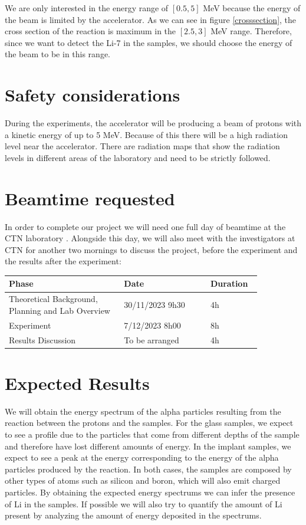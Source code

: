 \documentclass{article}
\begin{document}
\begin{multicols}{2}
We are only interested in the energy range of $[0.5,5]$ MeV because the energy of the beam is limited by the accelerator.
As we can see in figure \ref{crosssection}, the cross section of the reaction is maximum in the $[2.5,3]$ MeV range. 
Therefore, since we want to detect the Li-7 in the samples, we should choose the energy of the beam to be in this range.

\section{Safety considerations}

During the experiments, the accelerator will be producing a beam of protons with a kinetic energy of up to 5 MeV. Because of this there will be a high radiation level near the accelerator.
There are radiation maps that show the radiation levels in different areas of the laboratory and need to be strictly followed.

\section{Beamtime requested}

In order to complete our project we will need one full day of beamtime at the CTN laboratory \cite{IST}. Alongside this day, we will
also meet with the investigators at CTN for another two mornings to discuss the project, before the experiment and the
results after the experiment:

\begin{table}[H]
\centering
\begin{tabular}{|w{0.4\linewidth}|w{0.3\linewidth}|w{0.15\linewidth}|}
\hline
Phase & Date & Duration \\ \hline
Theoretical Background, Planning and Lab Overview & 30/11/2023 9h30 & 4h \\ \hline
Experiment & 7/12/2023 8h00 & 8h \\ \hline
Results Discussion & To be arranged & 4h \\ \hline
\end{tabular}
\end{table}

\section{Expected Results}

We will obtain the energy spectrum of the alpha particles resulting from the reaction between the protons and the
samples. 
For the glass samples, we expect to see a profile due to the particles that come from different depths of the sample and
therefore have lost different amounts of energy. In the implant samples, we expect to see a peak at the energy corresponding
to the energy of the alpha particles produced by the reaction.
In both cases, the samples are composed by other types of atoms such as silicon and boron, which will also emit charged
particles. By obtaining the expected energy spectrums we can infer the presence of Li in the samples. If possible we will also try
to quantify the amount of Li present by analyzing the amount of energy deposited in the spectrums.


\end{multicols}
\end{document}
